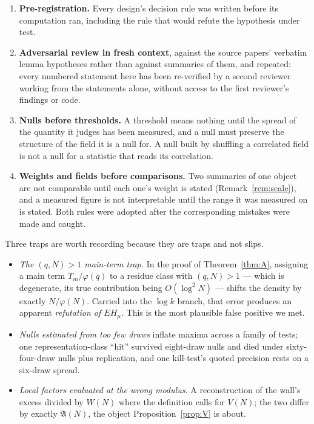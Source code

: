 \documentclass[11pt,a4paper]{article}
\theoremstyle{plain}
\theoremstyle{definition}
\newcommand{\AAA}{\mathfrak{A}}
\begin{document}
\begin{enumerate}
\item \textbf{Pre-registration.} Every design's decision rule was
  written before its computation ran, including the rule that would
  refute the hypothesis under test.
\item \textbf{Adversarial review in fresh context}, against the source
  papers' verbatim lemma hypotheses rather than against summaries of
  them, and repeated: every numbered statement here has been
  re-verified by a second reviewer working from the statements alone,
  without access to the first reviewer's findings or code.
\item \textbf{Nulls before thresholds.} A threshold means nothing until
  the spread of the quantity it judges has been measured, and a null
  must preserve the structure of the field it is a null for. A null
  built by shuffling a correlated field is not a null for a statistic
  that reads its correlation.
\item \textbf{Weights and fields before comparisons.} Two summaries of
  one object are not comparable until each one's weight is stated
  (Remark~\ref{rem:scale}), and a measured figure is not interpretable
  until the range it was measured on is stated. Both rules were adopted after the
  corresponding mistakes were made and caught.
\end{enumerate}

\noindent
Three traps are worth recording because they are traps and not slips.

\begin{itemize}
\item \emph{The $(q,N)>1$ main-term trap.} In the proof of
  Theorem~\ref{thm:A}, assigning a main term $T_m/\varphi(q)$ to a
  residue class with $(q,N)>1$ --- which is degenerate, its true
  contribution being $O(\log^2 N)$ --- shifts the density by exactly
  $N/\varphi(N)$. Carried into the $\log k$ branch, that error
  produces an apparent \emph{refutation of $EH_\mu$}. This is the most
  plausible false positive we met.
\item \emph{Nulls estimated from too few draws} inflate maxima across a
  family of tests; one representation-class ``hit'' survived
  eight-draw nulls and died under sixty-four-draw nulls plus
  replication, and one kill-test's quoted precision rests on a
  six-draw spread.
\item \emph{Local factors evaluated at the wrong modulus.} A
  reconstruction of the wall's excess divided by $W(N)$ where the
  definition calls for $V(N)$; the two differ by exactly $\AAA(N)$, the
  object Proposition~\ref{prop:V} is about.
\end{itemize}
\end{document}
